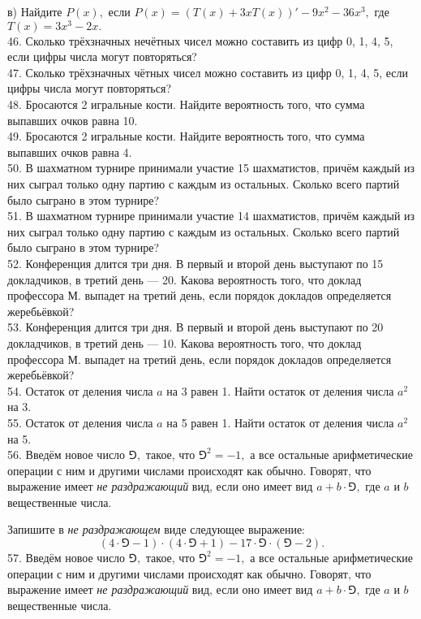 в) Найдите $P(x),$ если $P(x)=(T(x)+3xT(x))'-9x^2-36x^3,$ где $T(x)=3x^3-2x.$\\
46. Сколько трёхзначных нечётных чисел можно составить из цифр 0, 1, 4, 5, если цифры числа могут повторяться?\\
47. Сколько трёхзначных чётных чисел можно составить из цифр 0, 1, 4, 5, если цифры числа могут повторяться?\\
48. Бросаются 2 игральные кости. Найдите вероятность того, что сумма выпавших очков равна 10.\\
49. Бросаются 2 игральные кости. Найдите вероятность того, что сумма выпавших очков равна 4.\\
50. В шахматном турнире принимали участие 15 шахматистов, причём каждый из них сыграл только одну партию с каждым из остальных. Сколько всего партий было сыграно в этом турнире?\\
51. В шахматном турнире принимали участие 14 шахматистов, причём каждый из них сыграл только одну партию с каждым из остальных. Сколько всего партий было сыграно в этом турнире?\\
52. Конференция длится три дня. В первый и второй день выступают по 15 докладчиков, в третий день --- 20. Какова вероятность того, что доклад профессора М. выпадет на третий день, если порядок докладов определяется жеребьёвкой?\\
53. Конференция длится три дня. В первый и второй день выступают по 20 докладчиков, в третий день --- 10. Какова вероятность того, что доклад профессора М. выпадет на третий день, если порядок докладов определяется жеребьёвкой?\\
54. Остаток от деления числа $a$ на 3 равен 1. Найти остаток от деления числа $a^2$ на 3.\\
55. Остаток от деления числа $a$ на 5 равен 1. Найти остаток от деления числа $a^2$ на 5.\\
56. Введём новое число $\Game,$ такое, что $\Game^2=-1,$ а все остальные арифметические операции с ним и другими числами происходят как обычно. Говорят, что выражение имеет {\it не раздражающий} вид, если оно имеет вид $a+b\cdot\Game,$ где $a$ и $b$ вещественные числа.

Запишите в {\it не раздражающем} виде следующее выражение:
$$(4\cdot\Game-1)\cdot(4\cdot\Game+1)-17\cdot\Game\cdot(\Game-2).$$
57. Введём новое число $\Game,$ такое, что $\Game^2=-1,$ а все остальные арифметические операции с ним и другими числами происходят как обычно. Говорят, что выражение имеет {\it не раздражающий} вид, если оно имеет вид $a+b\cdot\Game,$ где $a$ и $b$ вещественные числа.

